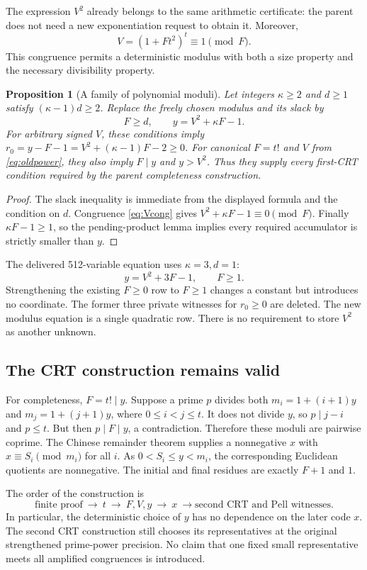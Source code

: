 \documentclass[11pt]{article}
\newtheorem{proposition}[theorem]{Proposition}
\theoremstyle{definition}\newtheorem{definition}[theorem]{Definition}
\theoremstyle{remark}\newtheorem{remark}[theorem]{Remark}
\begin{document}
The expression $V^2$ already belongs to the same arithmetic certificate:
the parent does not need a new exponentiation request to obtain it. Moreover,
\[
 V=(1+Ft^2)^t\equiv1\pmod F.
 \tag{8}\label{eq:Vcong}
\]
This congruence permits a deterministic modulus with both a size property
and the necessary divisibility property.

\begin{proposition}[A family of polynomial moduli]
Let integers $\kappa\ge2$ and $d\ge1$ satisfy $(\kappa-1)d\ge2$.
Replace the freely chosen modulus and its slack by
\[
 F\ge d,\qquad y=V^2+\kappa F-1.
 \tag{9}\label{eq:modfamily}
\]
For arbitrary signed $V$, these conditions imply
$r_0=y-F-1=V^2+(\kappa-1)F-2\ge0$.
For canonical $F=t!$ and $V$ from \eqref{eq:oldpower}, they also imply
$F\mid y$ and $y>V^2$. Thus they supply every first-CRT condition required
by the parent completeness construction.
\end{proposition}
\begin{proof}
The slack inequality is immediate from the displayed formula and the
condition on $d$. Congruence \eqref{eq:Vcong} gives
$V^2+\kappa F-1\equiv0\pmod F$. Finally
$\kappa F-1\ge1$, so the pending-product lemma implies every required
accumulator is strictly smaller than $y$.
\end{proof}

The delivered 512-variable equation uses $\kappa=3,d=1$:
\[
 \boxed{\quad y=V^2+3F-1,\qquad F\ge1.\quad}
 \tag{10}\label{eq:chosenmod}
\]
Strengthening the existing $F\ge0$ row to $F\ge1$ changes a constant
but introduces no coordinate. The former three private witnesses for
$r_0\ge0$ are deleted. The new modulus equation is a single quadratic
row. There is no requirement to store $V^2$ as another unknown.

\subsection{The CRT construction remains valid}
For completeness, $F=t!\mid y$. Suppose a prime $p$ divides both
$m_i=1+(i+1)y$ and $m_j=1+(j+1)y$, where $0\le i<j\le t$.
It does not divide $y$, so $p\mid j-i$ and $p\le t$.
But then $p\mid F\mid y$, a contradiction. Therefore these moduli are
pairwise coprime. The Chinese remainder theorem supplies a nonnegative $x$
with $x\equiv S_i\pmod {m_i}$ for all $i$. As
$0<S_i\le y<m_i$, the corresponding Euclidean quotients are nonnegative.
The initial and final residues are exactly $F+1$ and $1$.

The order of the construction is
\[
 \text{finite proof}\ \longrightarrow\ t\ \longrightarrow\ F,V,y
 \ \longrightarrow\ x\ \longrightarrow\text{second CRT and Pell witnesses}.
\]
In particular, the deterministic choice of $y$ has no dependence on the
later code $x$. The second CRT construction still chooses its representatives
at the original strengthened prime-power precision. No claim that one fixed
small representative meets all amplified congruences is introduced.
\end{document}
